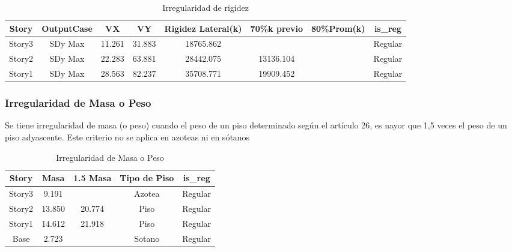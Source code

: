 \documentclass{article}%
\begin{document}
%


\begin{table}[h!]%
\centering%
\caption{Irregularidad de rigidez}%
\begin{tabular}{cccccccc}
\toprule
Story & OutputCase & VX & VY & Rigidez Lateral(k) & 70\%k previo & 80\%Prom(k) & is\_reg \\
\midrule
Story3 & SDy Max & 11.261 & 31.883 & 18765.862 &  &  & Regular \\
Story2 & SDy Max & 22.283 & 63.881 & 28442.075 & 13136.104 &  & Regular \\
Story1 & SDy Max & 28.563 & 82.237 & 35708.771 & 19909.452 &  & Regular \\
\bottomrule
\end{tabular}
%
\end{table}

%
\subsubsection{Irregularidad de Masa o Peso}%
\label{ssubsec:IrregularidaddeMasaoPeso}%
\begin{tcolorbox}[colback=gray!5!white,colframe=cyan!75!black,fonttitle=\bfseries,title=Tabla N°9 E-030]%
Se tiene irregularidad de masa (o peso) cuando el peso de un piso determinado según el artículo 26, es nayor que 1,5 veces el peso de un piso adyascente. Este criterio no se aplica en azoteas ni en sótanos%
\end{tcolorbox}%


\begin{table}[h!]%
\centering%
\caption{Irregularidad de Masa o Peso}%
\begin{tabular}{ccccc}
\toprule
Story & Masa & 1.5 Masa & Tipo de Piso & is\_reg \\
\midrule
Story3 & 9.191 &  & Azotea & Regular \\
Story2 & 13.850 & 20.774 & Piso & Regular \\
Story1 & 14.612 & 21.918 & Piso & Regular \\
Base & 2.723 &  & Sotano & Regular \\
\bottomrule
\end{tabular}
%
\end{table}

%
\end{document}
